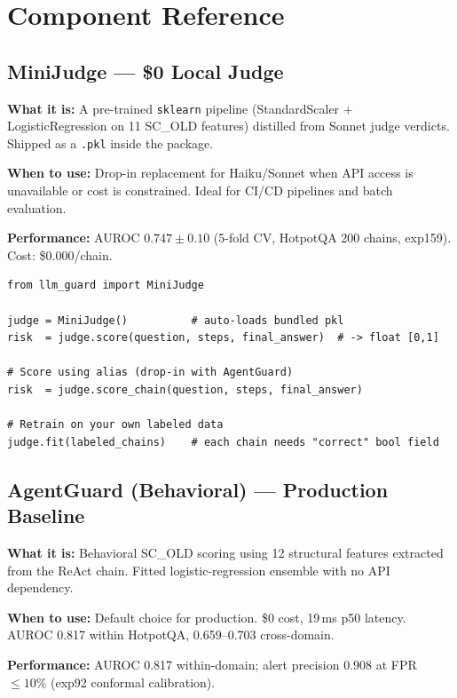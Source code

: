 \documentclass[11pt,a4paper]{article}
\begin{document}
\section{Component Reference}

\subsection{MiniJudge --- \$0 Local Judge}

\textbf{What it is:} A pre-trained \texttt{sklearn} pipeline
(StandardScaler + LogisticRegression on 11 SC\_OLD features) distilled from
Sonnet judge verdicts. Shipped as a \texttt{.pkl} inside the package.

\textbf{When to use:} Drop-in replacement for Haiku/Sonnet when API access
is unavailable or cost is constrained. Ideal for CI/CD pipelines and batch
evaluation.

\textbf{Performance:} AUROC $0.747 \pm 0.10$ (5-fold CV, HotpotQA 200 chains,
exp159). Cost: \$0.000/chain.

\begin{lstlisting}
from llm_guard import MiniJudge

judge = MiniJudge()          # auto-loads bundled pkl
risk  = judge.score(question, steps, final_answer)  # -> float [0,1]

# Score using alias (drop-in with AgentGuard)
risk  = judge.score_chain(question, steps, final_answer)

# Retrain on your own labeled data
judge.fit(labeled_chains)    # each chain needs "correct" bool field
\end{lstlisting}

\subsection{AgentGuard (Behavioral) --- Production Baseline}

\textbf{What it is:} Behavioral SC\_OLD scoring using 12 structural features
extracted from the ReAct chain. Fitted logistic-regression ensemble with
no API dependency.

\textbf{When to use:} Default choice for production. \$0 cost, 19\,ms p50 latency.
AUROC 0.817 within HotpotQA, 0.659--0.703 cross-domain.

\textbf{Performance:} AUROC 0.817 within-domain; alert precision 0.908 at
FPR $\leq 10\%$ (exp92 conformal calibration).
\end{document}
